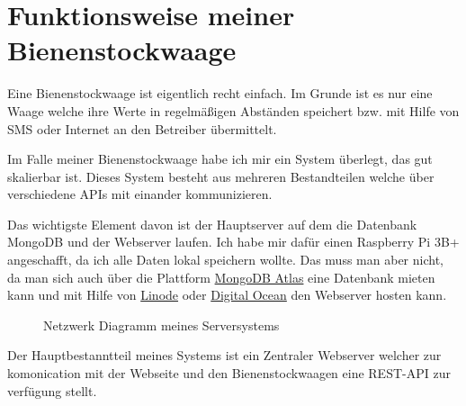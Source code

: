 \documentclass[a4paper, ngerman, 12pt]{scrartcl}
\begin{document}
\section{Funktionsweise meiner Bienenstockwaage}

Eine Bienenstockwaage ist eigentlich recht einfach.
Im Grunde ist es nur eine Waage welche ihre Werte in regelmäßigen Abständen speichert bzw.
mit Hilfe von SMS oder Internet an den Betreiber übermittelt.

Im Falle meiner Bienenstockwaage habe ich mir ein System überlegt, das gut skalierbar ist.
Dieses System besteht aus mehreren Bestandteilen welche über verschiedene APIs mit einander kommunizieren.

Das wichtigste Element davon ist der Hauptserver auf dem die Datenbank MongoDB und der Webserver laufen.
Ich habe mir dafür einen Raspberry Pi 3B+ angeschafft, da ich alle Daten lokal speichern wollte.
Das muss man aber nicht, da man sich auch über die Plattform \href{https://www.mongodb.com/cloud/atlas}{MongoDB Atlas} eine Datenbank mieten kann und mit Hilfe von \href{https://www.linode.com}{Linode} oder \href{https://www.digitalocean.com/}{Digital Ocean} den Webserver hosten kann.

\begin{figure}[ht]
	\centering
	\caption{Netzwerk Diagramm meines Serversystems\label{abb:networkdiagram}}
\end{figure}

Der Hauptbestanntteil meines Systems ist ein Zentraler Webserver welcher zur komonication mit der Webseite und den Bienenstockwaagen eine REST-API zur verfügung stellt.
\end{document}
